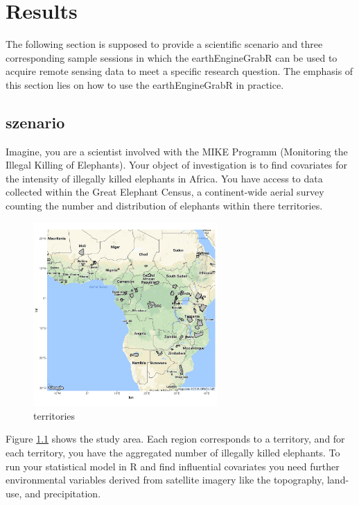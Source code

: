 \chapter{Results}

The following section is supposed to provide a scientific scenario and three corresponding sample sessions in which the earthEngineGrabR can be used to acquire remote sensing data to meet a specific research question. The emphasis of this section lies on how to use the earthEngineGrabR in practice. 

\section{szenario}

Imagine, you are a scientist involved with the MIKE Programm (Monitoring the Illegal Killing of Elephants). Your object of investigation is to find covariates for the intensity of illegally killed elephants in Africa. You have access to data collected within the Great Elephant Census, a continent-wide aerial survey counting the number and distribution of elephants within there territories. 


\begin{figure}
	\begin{center}
			\includegraphics[width=7cm]{images/territories.pdf}
	\end{center}
		\caption{territories}
		\label{territories}
\end{figure}

Figure \ref{territories} shows the study area. Each region corresponds to a territory, and for each territory, you have the aggregated number of illegally killed elephants. To run your statistical model in R and find influential covariates you need further environmental variables derived from satellite imagery like the topography, land-use, and precipitation. 


